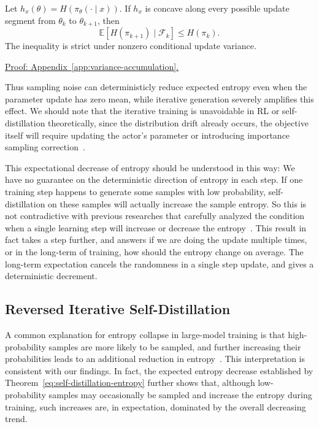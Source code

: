 \begin{theorem}
\label{lem:self-distillation-entropy}
Let $h_x(\theta)=H(\pi_\theta(\cdot\mid x))$. If $h_x$ is concave along every possible update segment from $\theta_k$ to $\theta_{k+1}$, then
\begin{equation}
 \mathbb E[H(\pi_{k+1})\mid\mathcal F_k]\le H(\pi_k).
 \label{eq:self-distillation-entropy}
\end{equation}
The inequality is strict under nonzero conditional update variance.
\end{theorem}
\noindent\hyperref[app:variance-accumulation]{Proof: Appendix~\ref*{app:variance-accumulation}.}

Thus sampling noise can deterministicly reduce expected entropy even when the parameter update has zero mean, while iterative generation severely amplifies this effect. We should note that the iterative training is unavoidable in RL or self-distillation theoretically, since the distribution drift already occurs, the objective itself will require updating the actor's parameter or introducing importance sampling correction~\citep{schulman_proximal_2017}.

This expectational decrease of entropy should be understood in this way: We have no guarantee on the deterministic direction of entropy in each step. If one training step happens to generate some samples with low probability, self-distillation on these samples will actually increase the sample entropy. So this is not contradictive with previous researches that carefully analyzed the condition when a single learning step will increase or decrease the entropy~\citep{cui_entropy_2025, ren_learning_2025, jin_revisiting_2026, wang_entropy_2026}. This result in fact takes a step further, and answers if we are doing the update multiple times, or in the long-term of training, how should the entropy change on average. The long-term expectation cancels the randomness in a single step update, and gives a deterministic decrement.

\subsection{Reversed Iterative Self-Distillation}

A common explanation for entropy collapse in large-model training is that high-probability samples are more likely to be sampled, and further increasing their probabilities leads to an additional reduction in entropy~\citep{cui_entropy_2025, hao_rethinking_2026}. This interpretation is consistent with our findings. In fact, the expected entropy decrease established by Theorem~\ref{eq:self-distillation-entropy} further shows that, although low-probability samples may occasionally be sampled and increase the entropy during training, such increases are, in expectation, dominated by the overall decreasing trend.

